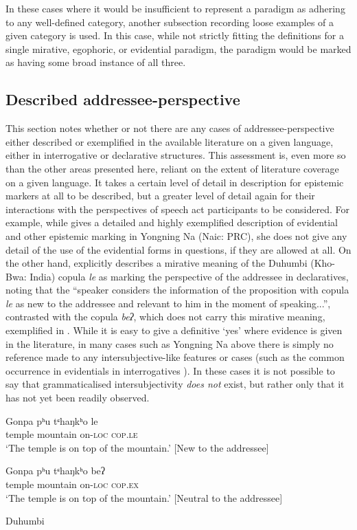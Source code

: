 In these cases where it would be insufficient to represent a paradigm as adhering to any well-defined category, another subsection recording loose examples of a given category is used. In this case, while not strictly fitting the definitions for a single mirative, egophoric, or evidential paradigm, the paradigm would be marked as having some broad instance of all three.

\subsection{Described addressee-perspective}\label{ss:Methods:Addressee}
This section notes whether or not there are any cases of addressee-perspective either described or exemplified in the available literature on a given language, either in interrogative or declarative structures. This assessment is, even more so than the other areas presented here, reliant on the extent of literature coverage on a given language. It takes a certain level of detail in description for epistemic markers at all to be described, but a greater level of detail again for their interactions with the perspectives of speech act participants to be considered. For example, while  gives a detailed and highly exemplified description of evidential and other epistemic marking in Yongning Na (Naic: PRC), she does not give any detail of the use of the evidential forms in questions, if they are allowed at all. On the other hand,  explicitly describes a mirative meaning of the Duhumbi (Kho-Bwa: India) copula \textit{le} as marking the perspective of the addressee in declaratives, noting that the ``speaker considers the information of the proposition with copula \textit{le} as new to the addressee and relevant to him in the moment of speaking...'', contrasted with the copula \textit{beʔ}, which does not carry this mirative meaning, exemplified in . While it is easy to give a definitive `yes' where evidence is given in the literature, in many cases such as Yongning Na above there is simply no reference made to any intersubjective-like features or cases (such as the common occurrence in evidentials in interrogatives \cite{Aikhenvald2018Intro}). In these cases it is not possible to say that grammaticalised intersubjectivity \textit{does not} exist, but rather only that it has not yet been readily observed.

\begin{exe}
\ex 
\begin{xlist}
\ex 
\gll Gonpa pʰu tᶝhaŋkʰo le \\
temple mountain on-\textsc{loc} \textsc{cop.le} \\
\glt `The temple is on top of the mountain.' [New to the addressee]

\ex 
\gll Gonpa pʰu tᶝhaŋkʰo beʔ \\
temple mountain on-\textsc{loc} \textsc{cop.ex} \\
\glt `The temple is on top of the mountain.' [Neutral to the addressee]
\end{xlist}
Duhumbi \cite[Kho-Bwa: India][408, notes on relation to addressee added by me]{Bodt2020}
\end{exe}

